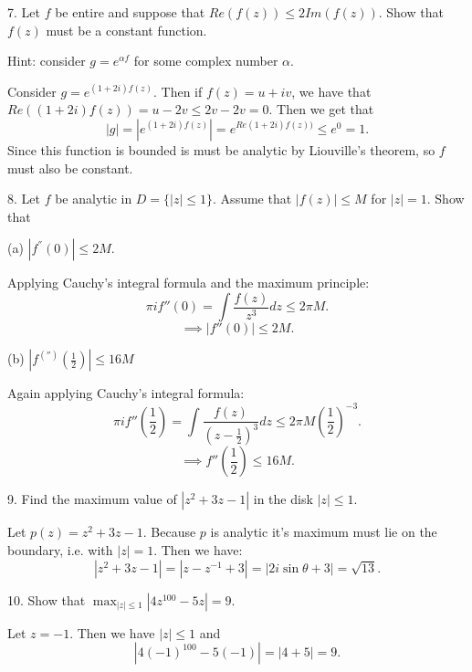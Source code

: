 \documentclass[letterpaper, reqno,11pt]{article}
\begin{document}

\medskip


7. Let $f$ be entire and suppose that $ Re (f(z)) \leq 2 Im (f(z))$. Show that $ f(z) $ must be a constant function.


Hint: consider $ g=e^{ \alpha  f}$ for some complex number $ \alpha $.

Consider $g=e^{(1+2i)f(z)}$. Then if $f(z)=u+iv$, we have that $Re((1+2i)f(z))=u-2v\leq 2v-2v=0$. Then we get that
\[
|g|=|e^{(1+2i)f(z)}|=e^{Re(1+2i)f(z))}\leq e^{0}=1
.\]
Since this function is bounded is must be analytic by Liouville's theorem, so $f$ must also be constant. 


\medskip


8. Let $ f$ be analytic in $D= \{ |z|\leq 1\}$. Assume that $ |f(z)|\leq M$ for $|z|=1$. Show that

(a) $ |f^{''} (0)|\leq 2M$. 

Applying Cauchy's integral formula and the maximum principle: 
\[
\pi i f''(0)=\int \frac{f(z)}{z^3}dz\leq 2\pi M
.\]
\[
\implies |f''(0)|\leq 2M
.\]

(b) $ |f^{('')} (\frac{1}{2})| \leq 16 M$

Again applying Cauchy's integral formula: 
\[
\pi i f''(\frac{1}{2})=\int \frac{f(z)}{(z-\frac{1}{2})^3}dz\leq 2\pi M \left( \frac{1}{2} \right) ^{-3}
.\]
\[
\implies f''(\frac{1}{2})\leq 16M
.\]


\medskip

9. Find the maximum value of $ |z^2+3z-1|$ in the disk $ |z|\leq 1$.

Let $p(z)=z^2+3z-1$. Because $p$ is analytic it's maximum must lie on the boundary, i.e. with $|z|=1$. Then we have: 
\[
\left| z^2+3z-1 \right|=\left| z-z^{-1}+3 \right|=\left| 2i\sin\theta+3 \right|=\sqrt{13} 
.\]


\medskip

10. Show that $ \max_{|z|\leq 1} |4 z^{100}-5z| = 9$.

Let $z=-1$. Then we have $|z|\leq 1$ and 
\[
|4(-1)^{100}-5(-1)|=|4+5|=9
.\]

 
\end{document}
